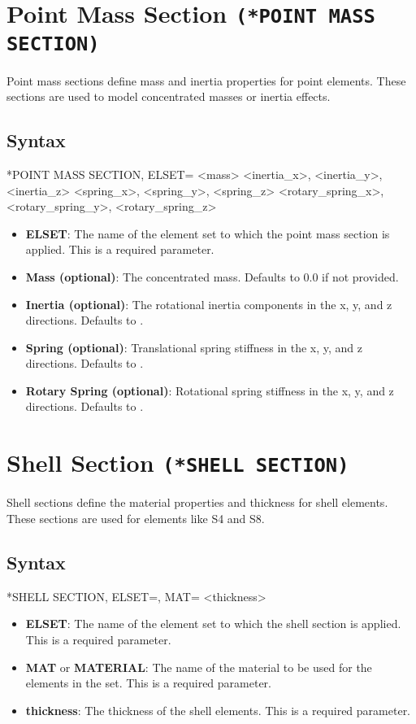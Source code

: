 \section{Point Mass Section \texttt{(*POINT MASS SECTION)}}
Point mass sections define mass and inertia properties for point elements. These sections are used to model concentrated masses or inertia effects.

\subsection{Syntax}
\begin{codeBlock}
*POINT MASS SECTION, ELSET=
<mass>
<inertia_x>, <inertia_y>, <inertia_z>
<spring_x>, <spring_y>, <spring_z>
<rotary_spring_x>, <rotary_spring_y>, <rotary_spring_z>
\end{codeBlock}

\begin{itemize}
\item \textbf{ELSET}: The name of the element set to which the point mass section is applied. This is a required parameter.
\item \textbf{Mass (optional)}: The concentrated mass. Defaults to 0.0 if not provided.
\item \textbf{Inertia (optional)}: The rotational inertia components in the x, y, and z directions. Defaults to .
\item \textbf{Spring (optional)}: Translational spring stiffness in the x, y, and z directions. Defaults to .
\item \textbf{Rotary Spring (optional)}: Rotational spring stiffness in the x, y, and z directions. Defaults to .
\end{itemize}

\section{Shell Section \texttt{(*SHELL SECTION)}}
Shell sections define the material properties and thickness for shell elements. These sections are used for elements like S4 and S8.

\subsection{Syntax}
\begin{codeBlock}
*SHELL SECTION, ELSET=, MAT=
<thickness>
\end{codeBlock}

\begin{itemize}
\item \textbf{ELSET}: The name of the element set to which the shell section is applied. This is a required parameter.
\item \textbf{MAT} or \textbf{MATERIAL}: The name of the material to be used for the elements in the set. This is a required parameter.
\item \textbf{thickness}: The thickness of the shell elements. This is a required parameter.
\end{itemize}

